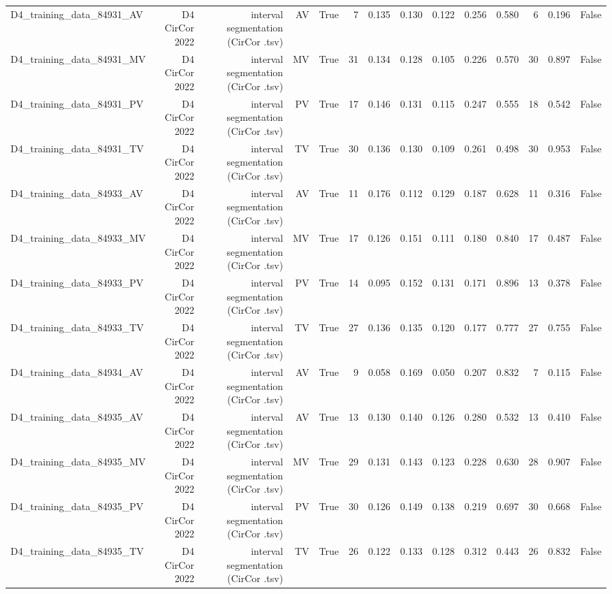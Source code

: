\begin{table}[htbp]
\begin{tabular}{lrrrrrrrrrrrrr}
    D4\_training\_data\_84931\_AV & D4 CirCor 2022 & interval segmentation (CirCor .tsv) & AV & True & 7 & 0.135 & 0.130 & 0.122 & 0.256 & 0.580 & 6 & 0.196 & False \\
    D4\_training\_data\_84931\_MV & D4 CirCor 2022 & interval segmentation (CirCor .tsv) & MV & True & 31 & 0.134 & 0.128 & 0.105 & 0.226 & 0.570 & 30 & 0.897 & False \\
    D4\_training\_data\_84931\_PV & D4 CirCor 2022 & interval segmentation (CirCor .tsv) & PV & True & 17 & 0.146 & 0.131 & 0.115 & 0.247 & 0.555 & 18 & 0.542 & False \\
    D4\_training\_data\_84931\_TV & D4 CirCor 2022 & interval segmentation (CirCor .tsv) & TV & True & 30 & 0.136 & 0.130 & 0.109 & 0.261 & 0.498 & 30 & 0.953 & False \\
    D4\_training\_data\_84933\_AV & D4 CirCor 2022 & interval segmentation (CirCor .tsv) & AV & True & 11 & 0.176 & 0.112 & 0.129 & 0.187 & 0.628 & 11 & 0.316 & False \\
    D4\_training\_data\_84933\_MV & D4 CirCor 2022 & interval segmentation (CirCor .tsv) & MV & True & 17 & 0.126 & 0.151 & 0.111 & 0.180 & 0.840 & 17 & 0.487 & False \\
    D4\_training\_data\_84933\_PV & D4 CirCor 2022 & interval segmentation (CirCor .tsv) & PV & True & 14 & 0.095 & 0.152 & 0.131 & 0.171 & 0.896 & 13 & 0.378 & False \\
    D4\_training\_data\_84933\_TV & D4 CirCor 2022 & interval segmentation (CirCor .tsv) & TV & True & 27 & 0.136 & 0.135 & 0.120 & 0.177 & 0.777 & 27 & 0.755 & False \\
    D4\_training\_data\_84934\_AV & D4 CirCor 2022 & interval segmentation (CirCor .tsv) & AV & True & 9 & 0.058 & 0.169 & 0.050 & 0.207 & 0.832 & 7 & 0.115 & False \\
    D4\_training\_data\_84935\_AV & D4 CirCor 2022 & interval segmentation (CirCor .tsv) & AV & True & 13 & 0.130 & 0.140 & 0.126 & 0.280 & 0.532 & 13 & 0.410 & False \\
    D4\_training\_data\_84935\_MV & D4 CirCor 2022 & interval segmentation (CirCor .tsv) & MV & True & 29 & 0.131 & 0.143 & 0.123 & 0.228 & 0.630 & 28 & 0.907 & False \\
    D4\_training\_data\_84935\_PV & D4 CirCor 2022 & interval segmentation (CirCor .tsv) & PV & True & 30 & 0.126 & 0.149 & 0.138 & 0.219 & 0.697 & 30 & 0.668 & False \\
    D4\_training\_data\_84935\_TV & D4 CirCor 2022 & interval segmentation (CirCor .tsv) & TV & True & 26 & 0.122 & 0.133 & 0.128 & 0.312 & 0.443 & 26 & 0.832 & False \\

\end{tabular}
\end{table}
